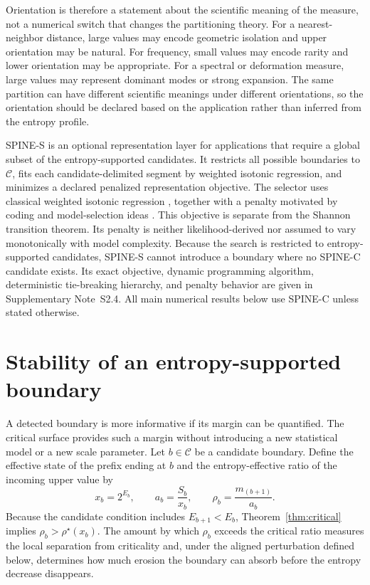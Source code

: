 \documentclass[aip,cha,reprint,superscriptaddress,floatfix]{revtex4-2}
\theoremstyle{definition}
\theoremstyle{remark}
\newcommand{\rhostar}{\rho^{\star}}
\newcommand{\cC}{\mathcal C}
\begin{document}
Orientation is therefore a statement about the scientific meaning of the measure, not a numerical switch that changes the partitioning theory. For a nearest-neighbor distance, large values may encode geometric isolation and upper orientation may be natural. For frequency, small values may encode rarity and lower orientation may be appropriate. For a spectral or deformation measure, large values may represent dominant modes or strong expansion. The same partition can have different scientific meanings under different orientations, so the orientation should be declared based on the application rather than inferred from the entropy profile.

SPINE-S is an optional representation layer for applications that require a global subset of the entropy-supported candidates. It restricts all possible boundaries to \(\cC\), fits each candidate-delimited segment by weighted isotonic regression, and minimizes a declared penalized representation objective. The selector uses classical weighted isotonic regression \cite{barlow1972,robertson1988,best1990}, together with a penalty motivated by coding and model-selection ideas \cite{rissanen1978,schwarz1978}. This objective is separate from the Shannon transition theorem. Its penalty is neither likelihood-derived nor assumed to vary monotonically with model complexity. Because the search is restricted to entropy-supported candidates, SPINE-S cannot introduce a boundary where no SPINE-C candidate exists. Its exact objective, dynamic programming algorithm, deterministic tie-breaking hierarchy, and penalty behavior are given in Supplementary Note~S2.4. All main numerical results below use SPINE-C unless stated otherwise.

\section{Stability of an entropy-supported boundary}
\label{sec:stability}

A detected boundary is more informative if its margin can be quantified. The critical surface provides such a margin without introducing a new statistical model or a new scale parameter. Let \(b\in\cC\) be a candidate boundary. Define the effective state of the prefix ending at \(b\) and the entropy-effective ratio of the incoming upper value by
\begin{equation}
x_b=2^{E_b},
\qquad
a_b=\frac{S_b}{x_b},
\qquad
\rho_b=\frac{m_{(b+1)}}{a_b}.
\label{eq:boundary-state}
\end{equation}
Because the candidate condition includes \(E_{b+1}<E_b\), Theorem~\ref{thm:critical} implies \(\rho_b>\rhostar(x_b)\). The amount by which \(\rho_b\) exceeds the critical ratio measures the local separation from criticality and, under the aligned perturbation defined below, determines how much erosion the boundary can absorb before the entropy decrease disappears.
\end{document}
